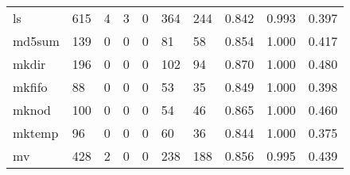 \begin{longtable}{lp{2.0cm}p{2.0cm}p{2.0cm}p{2.0cm}p{2.0cm}p{2.0cm}p{2.0cm}p{2.0cm}p{2.0cm}}
ls        &                    615 &                                             4 &                                            3 &                                           0 &                                          364 &                                        244 &                                0.842 &                                  0.993 &                                0.397 \\
md5sum    &                    139 &                                             0 &                                            0 &                                           0 &                                           81 &                                         58 &                                0.854 &                                  1.000 &                                0.417 \\
mkdir     &                    196 &                                             0 &                                            0 &                                           0 &                                          102 &                                         94 &                                0.870 &                                  1.000 &                                0.480 \\
mkfifo    &                     88 &                                             0 &                                            0 &                                           0 &                                           53 &                                         35 &                                0.849 &                                  1.000 &                                0.398 \\
mknod     &                    100 &                                             0 &                                            0 &                                           0 &                                           54 &                                         46 &                                0.865 &                                  1.000 &                                0.460 \\
mktemp    &                     96 &                                             0 &                                            0 &                                           0 &                                           60 &                                         36 &                                0.844 &                                  1.000 &                                0.375 \\
mv        &                    428 &                                             2 &                                            0 &                                           0 &                                          238 &                                        188 &                                0.856 &                                  0.995 &                                0.439 \\

\end{longtable}
